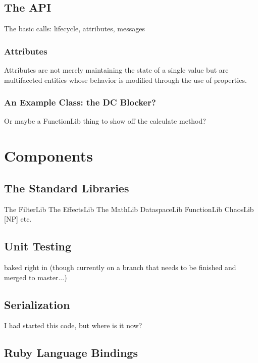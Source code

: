 \documentclass[twoside,10pt]{article}
\begin{document}
\subsection{The API}

The basic calls: lifecycle, attributes, messages

\subsubsection{Attributes}

Attributes are not merely maintaining the state of a single value but are multifaceted entities whose behavior is modified through the use of properties\cite{Place:2008params}.


\subsubsection{An Example Class: the DC Blocker?}

Or maybe a FunctionLib thing to show off the calculate method?



\section{Components} %

\subsection{The Standard Libraries}

The FilterLib
The EffectsLib
The MathLib
DataspaceLib
FunctionLib 
ChaosLib [NP]
etc.

\subsection{Unit Testing}

baked right in (though currently on a branch that needs to be finished and merged to master...)


\subsection{Serialization}

I had started this code, but where is it now?


\subsection{Ruby Language Bindings}
\end{document}
